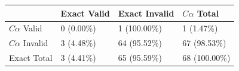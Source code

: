 \begin{tabular}{llll}
\toprule
 & Exact Valid & Exact Invalid & $C\alpha$ Total \\
\midrule
$C\alpha$ Valid & 0 (0.00\%) & 1 (100.00\%) & 1 (1.47\%) \\
$C\alpha$ Invalid & 3 (4.48\%) & 64 (95.52\%) & 67 (98.53\%) \\
Exact Total & 3 (4.41\%) & 65 (95.59\%) & 68 (100.00\%) \\
\bottomrule
\end{tabular}
